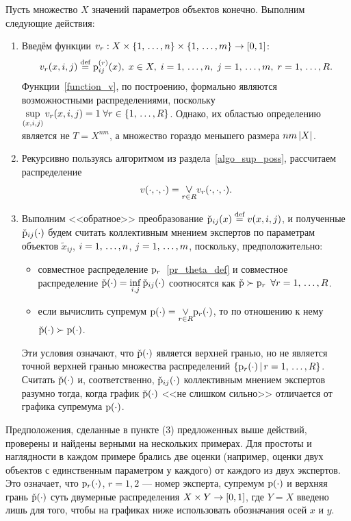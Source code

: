 Пусть множество $X$ значений параметров объектов конечно. Выполним следующие действия:
\begin{enumerate}
	\item Введём функции $v_r: X \times \{1,\, \ldots, n\} \times \{1,\, \ldots, m\} \rightarrow [0,1]$:
		  \begin{equation}
		      \label{function_v}
		      v_r(x, i, j) \overset{\text{def}}{=} {\mathrm{p}}_{ij}^{(r)}(x),\; x \in X, \; i = 1,\, \ldots, n,\; j = 1,\, \ldots, m,\; r = 1,\, \ldots, R.
		  \end{equation}
		  Функции~\eqref{function_v}, по построению, формально являются возможностными распределениями, поскольку $  \underset{(x,i,j)} \sup \,v_r(x,i,j) = 1\; \forall r \in \{1,\, \ldots, R\}$. Однако, их областью определению является не $T = X^{nm}$, а множество гораздо меньшего размера $nm\left| X \right|$.
	\item Рекурсивно пользуясь алгоритмом из раздела~\ref{algo_sup_poss}, рассчитаем распределение 
	\begin{equation*}	
	      v(\cdot,\cdot,\cdot) = \underset{r \in R} {\mathlarger \vee}  v_r(\cdot,\cdot,\cdot).
	\end{equation*}	
	\item Выполним <<обратное>> преобразование $\check{{\mathrm{p}}}_{ij}(x) \overset{\text{def}}{=} v(x, i,j)$, и полученные $\check{{\mathrm{p}}}_{ij}(\cdot)$ будем  считать коллективным мнением экспертов по параметрам объектов $\tilde x_{ij}$, $i = 1,\, \ldots, n$, $j = 1,\, \ldots, m$, поскольку, предположительно: 
	\begin{itemize}
	    \item
	    совместное распределение ${\mathrm{p}}_r$~\eqref{pr_theta_def} %
	    и совместное распределение $\check{{\mathrm{p}}}(\cdot) = \underset{i,j}\inf\, \check{{\mathrm{p}}}_{ij}(\cdot)$ соотносятся как $\check{{\mathrm{p}}} \succ {\mathrm{p}}_r$  $\forall r = 1,\, \ldots, R$. 
	    \item если вычислить супремум $\p(\cdot) = \underset{r \in R} {\mathlarger \vee}  \p_r(\cdot)$, то по отношению к нему $\check{{\mathrm{p}}}(\cdot) \succ {\mathrm{p}}(\cdot)$.  
	\end{itemize}
	Эти условия означают, что $\check{{\mathrm{p}}}(\cdot)$ является верхней гранью, но не является точной верхней гранью множества распределений $\{{\mathrm{p}}_r(\cdot) \,|\, r = 1,\, \ldots, R \}$. Считать $\check{{\mathrm{p}}}(\cdot)$ и, соответственно, $\check{{\mathrm{p}}}_{ij}(\cdot)$ коллективным мнением экспертов разумно тогда, когда график $\check{{\mathrm{p}}}(\cdot)$ <<не слишком сильно>> отличается от графика супремума ${\mathrm{p}}(\cdot)$.
\end{enumerate}	

Предположения, сделанные в пункте (3) предложенных выше действий, проверены и найдены верными на нескольких примерах. Для простоты и наглядности в каждом примере брались две оценки (например, оценки двух объектов с единственным параметром у каждого) от каждого из двух экспертов. Это означает, что ${\mathrm{p}}_r(\cdot)$, $r = 1,2$ --- номер эксперта, супремум ${\mathrm{p}}(\cdot)$ и верхняя грань $\check{{\mathrm{p}}}(\cdot)$ суть двумерные  распределения $X \times Y \rightarrow [0,1]$, где $Y = X$ введено лишь для того, чтобы на графиках ниже использовать обозначания осей $x$ и $y$. 

